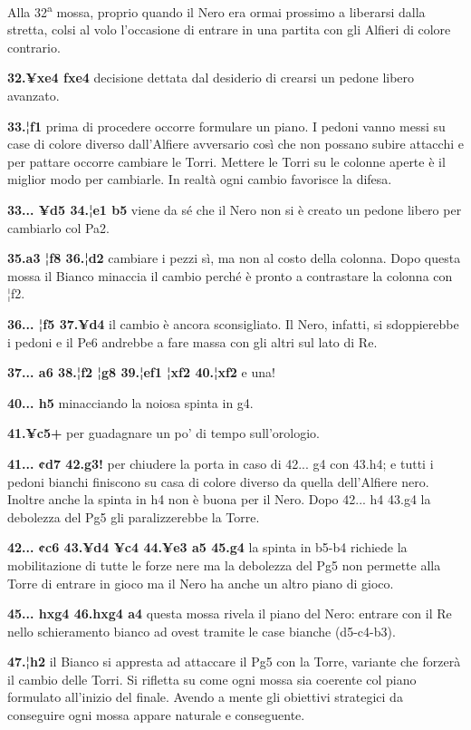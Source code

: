 Alla 32\textsuperscript{a} mossa, proprio quando il Nero era ormai
prossimo a liberarsi dalla stretta, colsi al volo l'occasione di entrare
in una partita con gli Alfieri di colore contrario.

\textbf{32.¥xe4 fxe4} decisione dettata dal desiderio di crearsi un
pedone libero avanzato.

\textbf{33.¦f1} prima di procedere occorre formulare un piano. I pedoni
vanno messi su case di colore diverso dall'Alfiere avversario così che
non possano subire attacchi e per pattare occorre cambiare le Torri.
Mettere le Torri su le colonne aperte è il miglior modo per cambiarle.
In realtà ogni cambio favorisce la difesa.

\textbf{33... ¥d5 34.¦e1 b5} viene da sé che il Nero non si è creato un
pedone libero per cambiarlo col Pa2.

\textbf{35.a3 ¦f8 36.¦d2} cambiare i pezzi sì, ma non al costo della
colonna. Dopo questa mossa il Bianco minaccia il cambio perché è pronto
a contrastare la colonna con ¦f2.

\textbf{36... ¦f5 37.¥d4} il cambio è ancora sconsigliato. Il Nero,
infatti, si sdoppierebbe i pedoni e il Pe6 andrebbe a fare massa con gli
altri sul lato di Re.

\textbf{37... a6 38.¦f2 ¦g8 39.¦ef1 ¦xf2 40.¦xf2} e una!

\textbf{40... h5} minacciando la noiosa spinta in g4.

\textbf{41.¥c5+} per guadagnare un po' di tempo sull'orologio.

\textbf{41... ¢d7 42.g3!} per chiudere la porta in caso di 42... g4 con
43.h4; e tutti i pedoni bianchi finiscono su casa di colore diverso da
quella dell'Alfiere nero. Inoltre anche la spinta in h4 non è buona per
il Nero. Dopo 42... h4 43.g4 la debolezza del Pg5 gli paralizzerebbe la
Torre.

\textbf{42... ¢c6 43.¥d4 ¥c4 44.¥e3 a5 45.g4} la spinta in b5-b4
richiede la mobilitazione di tutte le forze nere ma la debolezza del Pg5
non permette alla Torre di entrare in gioco ma il Nero ha anche un altro
piano di gioco.

\textbf{45... hxg4 46.hxg4 a4} questa mossa rivela il piano del Nero:
entrare con il Re nello schieramento bianco ad ovest tramite le case
bianche (d5-c4-b3).

\textbf{47.¦h2} il Bianco si appresta ad attaccare il Pg5 con la Torre,
variante che forzerà il cambio delle Torri. Si rifletta su come ogni
mossa sia coerente col piano formulato all'inizio del finale. Avendo a
mente gli obiettivi strategici da conseguire ogni mossa appare naturale
e conseguente.

